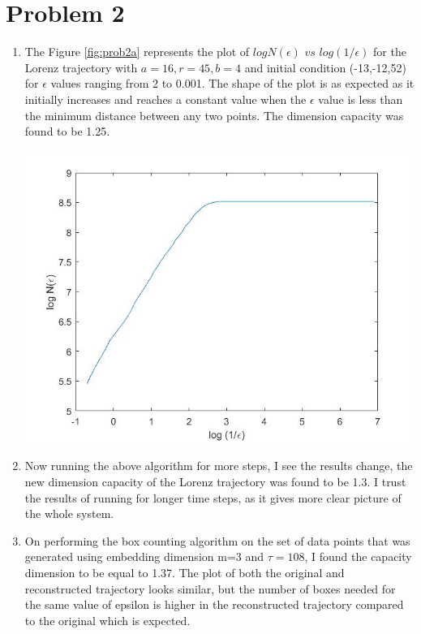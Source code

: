 \documentclass{article}
\begin{document}
\section*{Problem 2}
\begin{enumerate}[label=(\alph*)]
\item
The Figure \ref{fig:prob2a} represents the plot of $log N(\epsilon)\,\, vs\,\, log(1/\epsilon)$ for the Lorenz trajectory with $a=16, r=45, b=4$ and initial condition (-13,-12,52) for $\epsilon$ values ranging from 2 to 0.001. The shape of the plot is as expected as it initially increases and reaches a constant value when the $\epsilon$ value is less than the minimum distance between any two points. The dimension capacity was found to be 1.25.

\begin{minipage}{\linewidth}
{
\centering 
\includegraphics[scale=0.4]{images/prob2a.jpg}
\label{fig:prob2a}
}
\end{minipage}

\item
Now running the above algorithm for more steps, I see the results change, the new dimension capacity of the Lorenz trajectory was found to be 1.3. I trust the results of running for longer time steps, as it gives more clear picture of the whole system.  

\item
On performing the box counting algorithm on the set of data points that was generated using embedding dimension m=3 and $\tau=108$, I found the capacity dimension to be equal to 1.37. The plot of both the original and reconstructed trajectory looks similar, but the number of boxes needed for the same value of epsilon is higher in the reconstructed trajectory compared to the original which is expected.

\end{enumerate}
\end{document}
